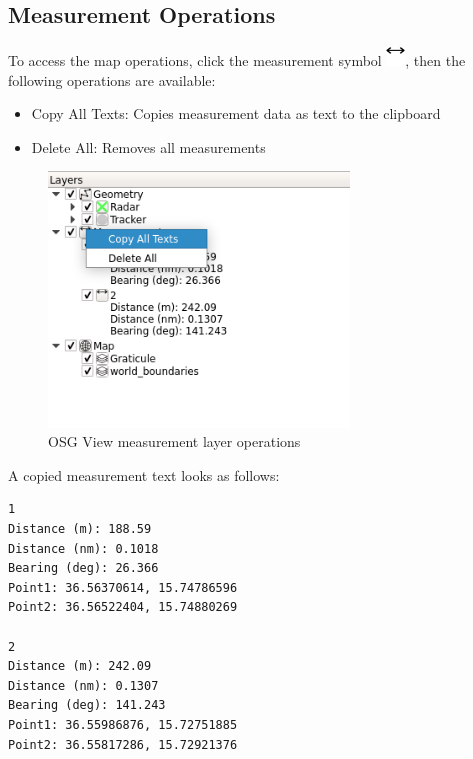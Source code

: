 \subsection{Measurement Operations}

To access the map operations, click the measurement symbol \includegraphics[width=0.5cm,frame]{../../data/icons/measure.png}, then the following operations are available:

\begin{itemize}
 \item Copy All Texts: Copies measurement data as text to the clipboard
 \item Delete All: Removes all measurements
\end{itemize} 

\begin{figure}[H]
    \includegraphics[width=8cm,frame]{../screenshots/osgview_measure_ops.png}
  \caption{OSG View measurement layer operations}
\end{figure}

A copied measurement text looks as follows:

\begin{verbatim}
1
Distance (m): 188.59
Distance (nm): 0.1018
Bearing (deg): 26.366
Point1: 36.56370614, 15.74786596
Point2: 36.56522404, 15.74880269

2
Distance (m): 242.09
Distance (nm): 0.1307
Bearing (deg): 141.243
Point1: 36.55986876, 15.72751885
Point2: 36.55817286, 15.72921376
\end{verbatim}
